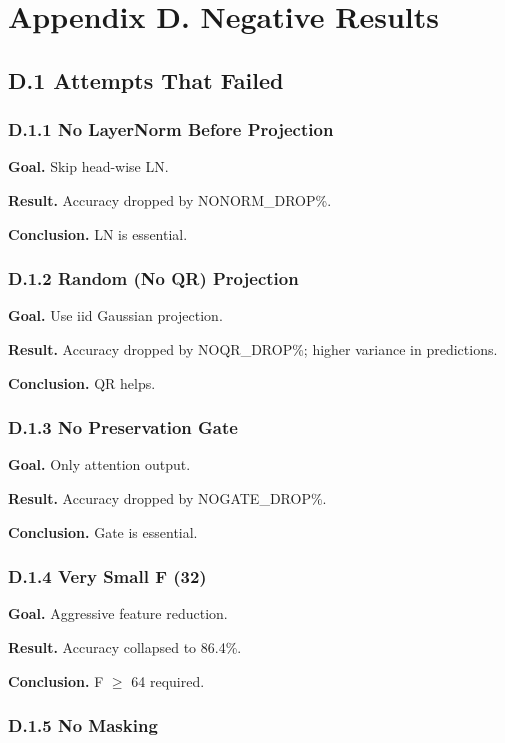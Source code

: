 \section{Appendix D. Negative Results}

\subsection{D.1 Attempts That Failed}

\subsubsection{D.1.1 No LayerNorm Before Projection}

\textbf{Goal.} Skip head-wise LN.

\textbf{Result.} Accuracy dropped by {{NONORM\_DROP}}\%.

\textbf{Conclusion.} LN is essential.

\subsubsection{D.1.2 Random (No QR) Projection}

\textbf{Goal.} Use iid Gaussian projection.

\textbf{Result.} Accuracy dropped by {{NOQR\_DROP}}\%; higher variance in 
predictions.

\textbf{Conclusion.} QR helps.

\subsubsection{D.1.3 No Preservation Gate}

\textbf{Goal.} Only attention output.

\textbf{Result.} Accuracy dropped by {{NOGATE\_DROP}}\%.

\textbf{Conclusion.} Gate is essential.

\subsubsection{D.1.4 Very Small F (32)}

\textbf{Goal.} Aggressive feature reduction.

\textbf{Result.} Accuracy collapsed to 86.4\%.

\textbf{Conclusion.} F $\ge$ 64 required.

\subsubsection{D.1.5 No Masking}

